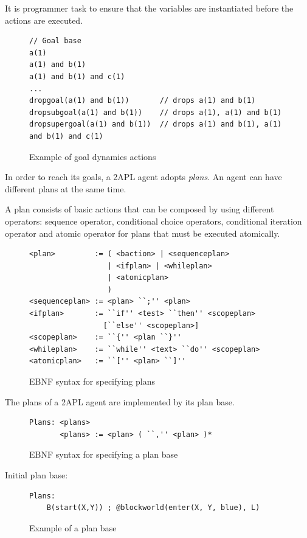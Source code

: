 \documentclass[a4paper]{article}
\begin{document}
It is programmer task to ensure that the variables are instantiated before the actions are executed.

\begin{figure}[htp]
\begin{verbatim}
// Goal base
a(1)
a(1) and b(1)
a(1) and b(1) and c(1)
...
dropgoal(a(1) and b(1))       // drops a(1) and b(1)
dropsubgoal(a(1) and b(1))    // drops a(1), a(1) and b(1)
dropsupergoal(a(1) and b(1))  // drops a(1) and b(1), a(1) and b(1) and c(1)
\end{verbatim}
\caption{Example of goal dynamics actions}
\label{fig:example_goalactions}
\end{figure}

In order to reach its goals, a 2APL agent adopts \emph{plans}. An agent can have different plans at the same time.

A plan consists of basic actions that can be composed by using different operators: sequence operator, conditional choice operators,  conditional iteration operator and atomic operator for plans that must be executed atomically.

\begin{figure}[htp]
\begin{verbatim}
<plan>         := ( <baction> | <sequenceplan>
                  | <ifplan> | <whileplan>
                  | <atomicplan>
                  )
<sequenceplan> := <plan> ``;'' <plan>
<ifplan>       := ``if'' <test> ``then'' <scopeplan>
                 [``else'' <scopeplan>]
<scopeplan>    := ``{'' <plan ``}''
<whileplan>    := ``while'' <text> ``do'' <scopeplan>
<atomicplan>   := ``['' <plan> ``]''
\end{verbatim}
\caption{EBNF syntax for specifying plans}
\label{fig:ebnf_plans}
\end{figure}

The plans of a 2APL agent are implemented by its plan base.

\begin{figure}[htp]	
\begin{verbatim}
Plans: <plans>
       <plans> := <plan> ( ``,'' <plan> )*
\end{verbatim}
\caption{EBNF syntax for specifying a plan base}
\label{fig:ebnf_planbase}
\end{figure}

Initial plan base:

\begin{figure}[htp]
\begin{verbatim}
Plans:
	B(start(X,Y)) ; @blockworld(enter(X, Y, blue), L)
\end{verbatim}	
\caption{Example of a plan base}
\label{fig:ebnf_planbase}
\end{figure}
\end{document}
